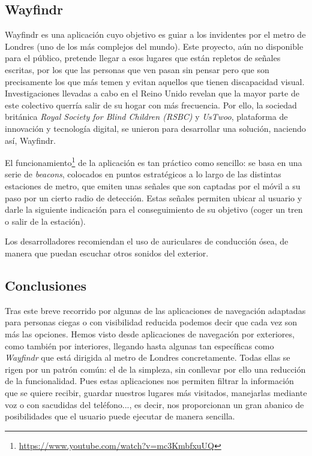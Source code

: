 \subsection{Wayfindr} 
Wayfindr \citep{wayfindrOnline} es una aplicación cuyo objetivo es guiar a los invidentes por el metro de Londres (uno de los más complejos del mundo). Este proyecto, aún no disponible para el público, pretende llegar a esos lugares que están repletos de señales escritas, por los que las personas que ven pasan sin pensar pero que son precisamente los que más temen y evitan aquellos que tienen discapacidad visual. Investigaciones llevadas a cabo en el Reino Unido revelan que la mayor parte de este colectivo querría salir de su hogar con más frecuencia. Por ello, la sociedad británica \textit{Royal Society for Blind Children (RSBC)} y \textit{UsTwoo}, plataforma de innovación y tecnología digital, se unieron para desarrollar una solución, naciendo así, Wayfindr.

El funcionamiento\footnote{\url{https://www.youtube.com/watch?v=mc3KmbfxuUQ}} de la aplicación es tan práctico como sencillo: se basa en una serie de \textit{beacons}, colocados en puntos estratégicos a lo largo de las distintas estaciones de metro, que emiten unas señales que son captadas por el móvil a su paso por un cierto radio de detección. Estas señales permiten ubicar al usuario y darle la siguiente indicación para el conseguimiento de su objetivo (coger un tren o salir de la estación).

Los desarrolladores recomiendan el uso de auriculares de conducción ósea, de manera que puedan escuchar otros sonidos del exterior.

\subsection{Conclusiones}
Tras este breve recorrido por algunas de las aplicaciones de navegación adaptadas para personas ciegas o con visibilidad reducida podemos decir que cada vez son más las opciones. Hemos visto desde aplicaciones de navegación por exteriores, como también por interiores, llegando hasta algunas tan específicas como \textit{Wayfindr} que está dirigida al metro de Londres concretamente. Todas ellas se rigen por un patrón común: el de la simpleza, sin conllevar por ello una reducción de la funcionalidad. Pues estas aplicaciones nos permiten filtrar la información que se quiere recibir, guardar nuestros lugares más visitados, manejarlas mediante voz o con sacudidas del teléfono..., es decir, nos proporcionan un gran abanico de posibilidades que el usuario puede ejecutar de manera sencilla.

